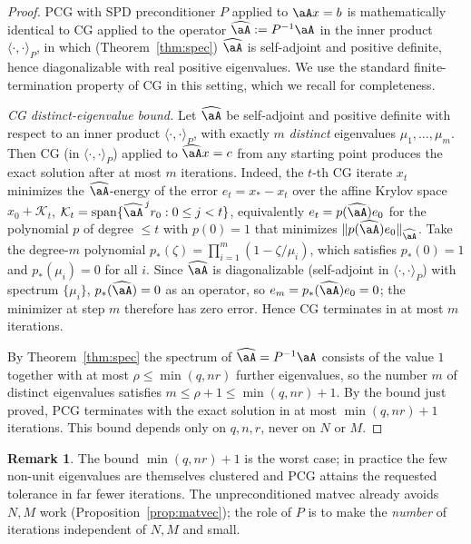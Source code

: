 \documentclass[12pt]{article}
\theoremstyle{definition}
\newtheorem{remark}{Remark}
\begin{document}
\begin{proof}
PCG with SPD preconditioner $P$ applied to $\aA x=b$ is mathematically
identical to CG applied to the operator $\widehat{\aA}:=P^{-1}\aA$ in the
inner product $\langle\cdot,\cdot\rangle_P$, in which (Theorem~\ref{thm:spec})
$\widehat\aA$ is self-adjoint and positive definite, hence diagonalizable with
real positive eigenvalues. We use the standard finite-termination property of CG
in this setting, which we recall for completeness.

\smallskip\noindent\emph{CG distinct-eigenvalue bound.} Let $\widehat\aA$ be
self-adjoint and positive definite with respect to an inner product
$\langle\cdot,\cdot\rangle_P$, with exactly $m$ \emph{distinct} eigenvalues
$\mu_1,\dots,\mu_m$. Then CG (in $\langle\cdot,\cdot\rangle_P$) applied to
$\widehat\aA x=c$ from any starting point produces the exact solution after at
most $m$ iterations. Indeed, the $t$-th CG iterate $x_t$ minimizes the
$\widehat\aA$-energy of the error $e_t=x_*-x_t$ over the affine Krylov space
$x_0+\mathcal K_t$, $\mathcal K_t=\mathrm{span}\{\widehat\aA^{\,j}r_0:0\le j<t\}$,
equivalently $e_t=p(\widehat\aA)e_0$ for the polynomial $p$ of degree $\le t$
with $p(0)=1$ that minimizes $\|p(\widehat\aA)e_0\|_{\widehat\aA}$. Take the
degree-$m$ polynomial $p_*(\zeta)=\prod_{i=1}^{m}(1-\zeta/\mu_i)$, which
satisfies $p_*(0)=1$ and $p_*(\mu_i)=0$ for all $i$. Since $\widehat\aA$ is
diagonalizable (self-adjoint in $\langle\cdot,\cdot\rangle_P$) with spectrum
$\{\mu_i\}$, $p_*(\widehat\aA)=0$ as an operator, so $e_m=p_*(\widehat\aA)e_0=0$;
the minimizer at step $m$ therefore has zero error. Hence CG terminates in at
most $m$ iterations.

\smallskip\noindent
By Theorem~\ref{thm:spec} the spectrum of $\widehat\aA=P^{-1}\aA$ consists of
the value $1$ together with at most $\rho\le\min(q,nr)$ further eigenvalues, so
the number $m$ of distinct eigenvalues satisfies $m\le\rho+1\le\min(q,nr)+1$.
By the bound just proved, PCG terminates with the exact solution in at most
$\min(q,nr)+1$ iterations. This bound depends only on $q,n,r$, never on $N$ or
$M$.
\end{proof}

\begin{remark}
The bound $\min(q,nr)+1$ is the worst case; in practice the few non-unit
eigenvalues are themselves clustered and PCG attains the requested tolerance in
far fewer iterations. The unpreconditioned matvec already avoids $N,M$ work
(Proposition~\ref{prop:matvec}); the role of $P$ is to make the
\emph{number} of iterations independent of $N,M$ and small.
\end{remark}
\end{document}
